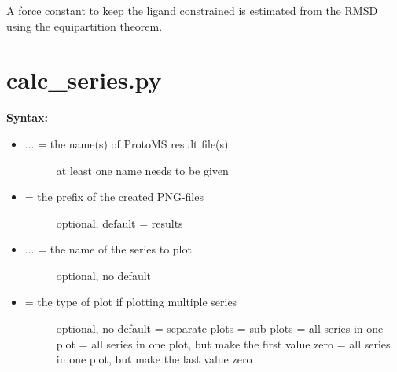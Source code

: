 \documentclass[letterpaper,10pt,english]{sphinxmanual}
\begin{document}
A force constant to keep the ligand constrained is estimated from the RMSD using the equipartition theorem.


\section{calc\_series.py}
\label{tools:calc-series-py}
\textbf{Syntax:}

\begin{itemize}
\item {} \begin{description}
\item[{ ... = the name(s) of ProtoMS result file(s)}] \leavevmode
at least one name needs to be given

\end{description}

\item {} \begin{description}
\item[{ = the prefix of the created PNG-files}] \leavevmode
optional, default = results

\end{description}

\item {} \begin{description}
\item[{ ... = the name of the series to plot}] \leavevmode
optional, no default

\end{description}

\item {} \begin{description}
\item[{ = the type of plot if plotting multiple series}] \leavevmode
optional, no default
 = separate plots
 = sub plots
 = all series in one plot
 = all series in one plot, but make the first value zero
 = all series in one plot, but make the last value zero

\end{description}


\end{itemize}
\end{document}
